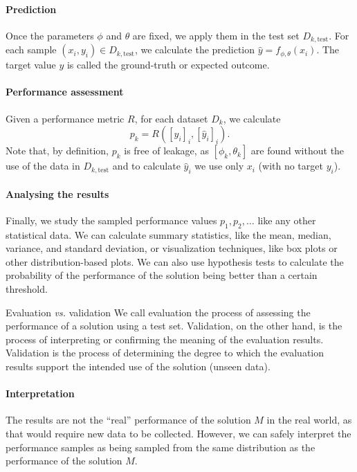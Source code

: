 \paragraph{Prediction}  Once the parameters $\phi$ and $\theta$ are fixed, we apply them
in the test set $D_{k,\text{test}}$.  For each sample $(x_i, y_i) \in D_{k,\text{test}}$,
we calculate the prediction $\hat{y} = f_{\phi,\theta}(x_i)$.  The target value $y$ is
called the ground-truth or expected outcome.

\paragraph{Performance assessment} Given a performance metric $R$, for each dataset $D_k$,
we calculate
$$p_k = R\!\left(\left[y_i\right]_i, \left[\hat{y}_i\right]_i\right)\text{.}$$
Note that, by definition, $p_k$ is free of \gls{leakage}, as $\left[\phi_k,
\theta_k\right]$ are found without the use of the data in $D_{k,\text{test}}$ and to
calculate $\hat{y}_i$ we use only $x_i$ (with no target $y_i$).

\paragraph{Analysing the results} Finally, we study the sampled performance values $p_1,
p_2, \ldots$ like any other statistical data.  We can calculate summary statistics, like
the mean, median, variance, and standard deviation, or visualization techniques, like
box plots or other distribution-based plots.  We can also use hypothesis tests to
calculate the probability of the performance of the solution being better than a certain
threshold.

\begin{hlbox}{Evaluation \emph{vs.} validation}
  We call evaluation the process of assessing the performance of a solution using a
  test set.  Validation, on the other hand, is the process of interpreting or confirming
  the meaning of the evaluation results.  Validation is the process of determining the
  degree to which the evaluation results support the intended use of the solution (unseen
  data).
\end{hlbox}

\paragraph{Interpretation}  The results are not the ``real'' performance of the solution
$M$ in the real world, as that would require new data to be collected.  However, we can
safely interpret the performance samples as being sampled from the same distribution as
the performance of the solution $M$.

